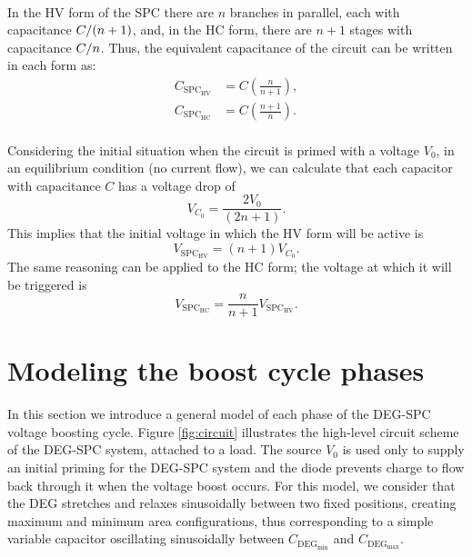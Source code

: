 \paragraph{} In the HV form of the SPC there are $n$ branches in parallel, each with capacitance ${C}/{(n+1)}$, and, in the HC form, there are $n+1$ stages with capacitance ${C}/{n}$. Thus, the equivalent capacitance of the circuit can be written in each form as: \begin{align}
C_{\text{SPC}_\text{HV}}&=C\left(\frac{n}{n+1}\right),\label{eq:cspchv}\\
C_{\text{SPC}_\text{HC}}&=C\left(\frac{n+1}{n}\right).\label{eq:cspchc}
\end{align}

\paragraph{} Considering the initial situation when the circuit is primed with a voltage $V_0$, in an equilibrium condition (no current flow), we can calculate that each capacitor with capacitance $C$ has a voltage drop of
\begin{equation}
V_{C_{0}}=\frac{2V_{0}}{(2n+1)}.
\end{equation}
This implies that the initial voltage in which the HV form will be active is
\begin{equation}
V_{\text{SPC}_\text{HV}} = (n+1)V_{C_{0}}.
\end{equation}
The same reasoning can be applied to the HC form; the voltage at which it will be triggered is
\begin{equation}
V_{\text{SPC}_\text{HC}} = \frac{n}{n+1}V_{\text{SPC}_\text{HV}}.
\end{equation}

\section{Modeling the boost cycle phases}
In this section we introduce a general model of each phase of the DEG-SPC voltage boosting cycle.  Figure \ref{fig:circuit} illustrates the high-level circuit scheme of the DEG-SPC system, attached to a load. The source $V_0$ is used only to supply an initial priming for the DEG-SPC system and the diode prevents charge to flow back through it when the voltage boost occurs. For this model, we consider that the DEG stretches and relaxes sinusoidally between two fixed positions, creating maximum and minimum area configurations, thus corresponding to a simple variable capacitor oscillating sinusoidally between $C_{\text{DEG}_\text{min}}$ and $C_{\text{DEG}_\text{max}}$.

